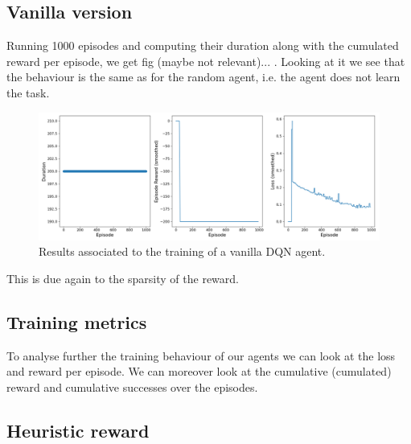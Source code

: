\documentclass[a4paper, 12pt,oneside]{article}
\begin{document}
        \subsection{Vanilla version}
        Running 1000 episodes and computing their duration along with the cumulated reward per episode, we get fig (maybe not relevant)... . Looking at it we see that the behaviour is the same as for the random agent, i.e. the agent does not learn the task.
        \begin{figure}[h!]
            \centering
            \vspace{0em}
            \includegraphics[width=.9\textwidth]{../runs/dqn_vanilla/up-tau=1/figs/full_results}
            \caption{Results associated to the training of a vanilla DQN agent.}
            \label{fig:dqn-vanilla-neps=1000}
        \end{figure}
        This is due again to the sparsity of the reward. 
        \subsection{Training metrics}
        To analyse further the training behaviour of our agents we can look at the loss and reward per episode. We can moreover look at the cumulative (cumulated) reward and cumulative successes over the episodes. 
        \subsection{Heuristic reward}
\end{document}
